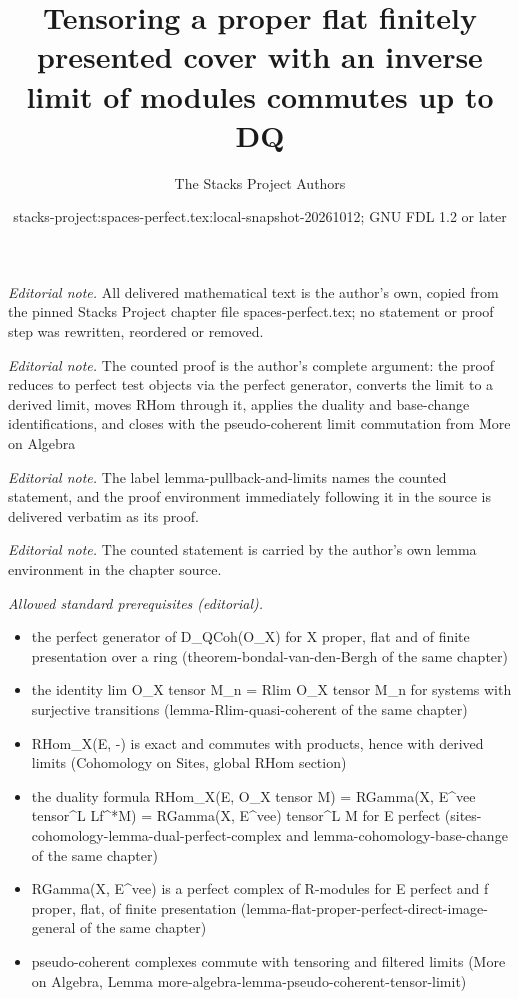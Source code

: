 \documentclass[10pt,a4paper]{amsart}
\title{Tensoring a proper flat finitely presented cover with an inverse limit of modules commutes up to DQ}
\author{The Stacks Project Authors}
\date{stacks-project:spaces-perfect.tex:local-snapshot-20261012; GNU FDL 1.2 or later}
\theoremstyle{plain}
\theoremstyle{definition}
\theoremstyle{remark}
\numberwithin{equation}{subsection}
\begin{document}
\maketitle
\noindent\textit{Editorial note.} All delivered mathematical text is the author's own, copied from the pinned Stacks Project chapter file spaces-perfect.tex; no statement or proof step was rewritten, reordered or removed.\par\medskip
\noindent\textit{Editorial note.} The counted proof is the author's complete argument: the proof reduces to perfect test objects via the perfect generator, converts the limit to a derived limit, moves RHom through it, applies the duality and base-change identifications, and closes with the pseudo-coherent limit commutation from More on Algebra\par\medskip
\noindent\textit{Editorial note.} The label lemma-pullback-and-limits names the counted statement, and the proof environment immediately following it in the source is delivered verbatim as its proof.\par\medskip
\noindent\textit{Editorial note.} The counted statement is carried by the author's own lemma environment in the chapter source.\par\medskip
\noindent\textit{Allowed standard prerequisites (editorial).}\begin{itemize}
\item the perfect generator of D\_QCoh(O\_X) for X proper, flat and of finite presentation over a ring (theorem-bondal-van-den-Bergh of the same chapter)
\item the identity lim O\_X tensor M\_n = Rlim O\_X tensor M\_n for systems with surjective transitions (lemma-Rlim-quasi-coherent of the same chapter)
\item RHom\_X(E, -) is exact and commutes with products, hence with derived limits (Cohomology on Sites, global RHom section)
\item the duality formula RHom\_X(E, O\_X tensor M) = RGamma(X, E\textasciicircum{}vee tensor\textasciicircum{}L Lf\textasciicircum{}*M) = RGamma(X, E\textasciicircum{}vee) tensor\textasciicircum{}L M for E perfect (sites-cohomology-lemma-dual-perfect-complex and lemma-cohomology-base-change of the same chapter)
\item RGamma(X, E\textasciicircum{}vee) is a perfect complex of R-modules for E perfect and f proper, flat, of finite presentation (lemma-flat-proper-perfect-direct-image-general of the same chapter)
\item pseudo-coherent complexes commute with tensoring and filtered limits (More on Algebra, Lemma more-algebra-lemma-pseudo-coherent-tensor-limit)
\end{itemize}\medskip
\end{document}
